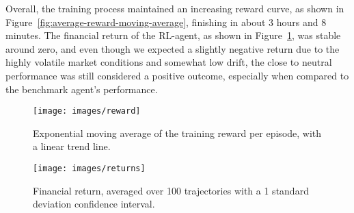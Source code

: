 
Overall, the training process maintained an increasing reward curve, as shown in Figure~\ref{fig:average-reward-moving-average},
finishing in about 3 hours and 8 minutes.
The financial return of the RL-agent, as shown in Figure~\ref{fig:average-financial-return}, was stable around zero,
and even though we expected a slightly negative return due to the highly volatile market conditions and
somewhat low drift, the close to neutral performance was still considered a positive outcome,
especially when compared to the benchmark agent's performance.


\begin{figure}[t]
    \centering
    \begin{minipage}{\columnwidth}
        \centering
        \texttt{[image: images/reward]}
        \caption{Exponential moving average of the training reward per episode, with a linear trend line.}
        \label{fig:average-reward-moving-average}
    \end{minipage}
    \vspace{0.04\textwidth} %
    \begin{minipage}{\columnwidth}
        \centering
        \texttt{[image: images/returns]}
        \caption{Financial return, averaged over 100 trajectories with a 1 standard deviation confidence interval.}
        \label{fig:average-financial-return}
    \end{minipage}
\end{figure}